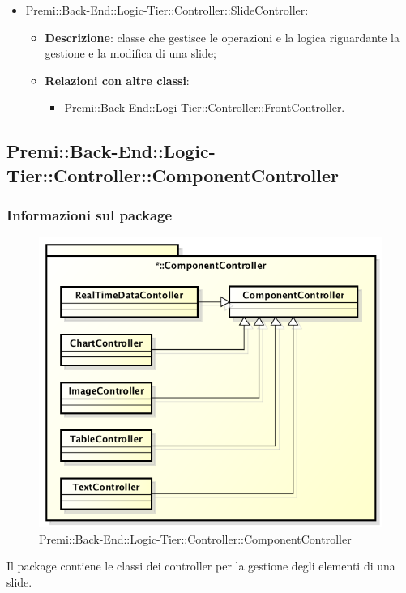 \begin{itemize}
			\item Premi::Back-End::Logic-Tier::Controller::SlideController:
			\begin{itemize}
				\item \textbf{Descrizione}: classe che gestisce le operazioni e la logica riguardante la gestione e la modifica di una slide;
				\item \textbf{Relazioni con altre classi}:
				\begin{itemize}
					\item Premi::Back-End::Logi-Tier::Controller::FrontController.
				\end{itemize}
			\end{itemize}
		\end{itemize}
		
\newpage
	
\subsection{Premi::Back-End::Logic-Tier::Controller::ComponentController}
	\subsubsection*{Informazioni sul package}
		\begin{figure}[h]
			\centering
			\includegraphics[width=0.9\linewidth]{img/back-end_logic-tier_controller_componentcontroller}
			\caption[Premi::Back-End::Logic-Tier::Controller::ComponentController]{Premi::Back-End::Logic-Tier::Controller::ComponentController}
		\end{figure}
		Il package contiene le classi dei controller per la gestione degli elementi di una slide.
		
